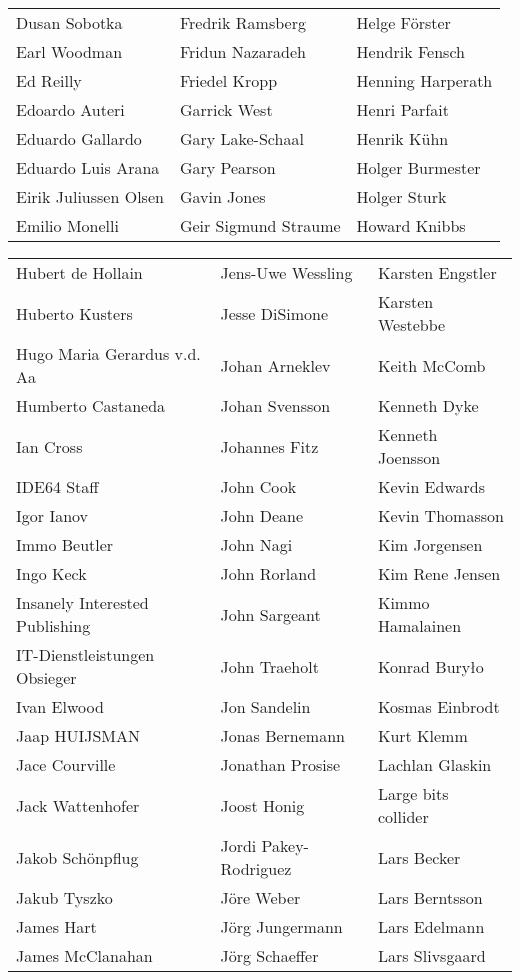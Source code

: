 \begin{tabular}{p{4.5cm}p{4.5cm}p{4.5cm}}
Dusan Sobotka & Fredrik Ramsberg & Helge Förster \\
Earl Woodman & Fridun Nazaradeh & Hendrik Fensch \\
Ed Reilly & Friedel Kropp & Henning Harperath \\
Edoardo Auteri & Garrick West & Henri Parfait \\
Eduardo Gallardo & Gary Lake-Schaal & Henrik Kühn \\
Eduardo Luis Arana & Gary Pearson & Holger Burmester \\
Eirik Juliussen Olsen & Gavin Jones & Holger Sturk \\
Emilio Monelli & Geir Sigmund Straume & Howard Knibbs \\
\end{tabular}
\newpage
\setlength{\tabcolsep}{1mm}
\begin{tabular}{p{4.5cm}p{4.5cm}p{4.5cm}}
Hubert de Hollain & Jens-Uwe Wessling & Karsten Engstler \\
Huberto Kusters & Jesse DiSimone & Karsten Westebbe \\
Hugo Maria Gerardus v.d. Aa & Johan Arneklev & Keith McComb \\
Humberto Castaneda & Johan Svensson & Kenneth Dyke \\
Ian Cross & Johannes Fitz & Kenneth Joensson \\
IDE64 Staff & John Cook & Kevin Edwards \\
Igor Ianov & John Deane & Kevin Thomasson \\
Immo Beutler & John Nagi & Kim Jorgensen \\
Ingo Keck & John Rorland & Kim Rene Jensen \\
Insanely Interested Publishing & John Sargeant & Kimmo Hamalainen \\
IT-Dienstleistungen Obsieger & John Traeholt & Konrad Buryło \\
Ivan Elwood & Jon Sandelin & Kosmas Einbrodt \\
Jaap HUIJSMAN & Jonas Bernemann & Kurt Klemm \\
Jace Courville & Jonathan Prosise & Lachlan Glaskin \\
Jack Wattenhofer & Joost Honig & Large bits collider \\
Jakob Schönpflug & Jordi Pakey-Rodriguez & Lars Becker \\
Jakub Tyszko & Jöre Weber & Lars Berntsson \\
James Hart & Jörg Jungermann & Lars Edelmann \\
James McClanahan & Jörg Schaeffer & Lars Slivsgaard \\

\end{tabular}
